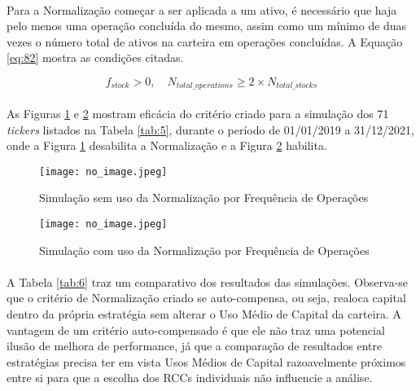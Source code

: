 \paragraph{} Para a Normalização começar a ser aplicada a um ativo, é necessário que haja pelo menos uma operação concluída do mesmo, assim como um mínimo de duas vezes o número total de ativos na carteira em operações concluídas. A Equação \ref{eq:82} mostra as condições citadas.

\begin{equation} \label{eq:82}
    f_{stock} > 0, \quad N_{total\_operations} \ge 2 \times N_{total\_stocks}
\end{equation}

\paragraph{} As Figuras \ref{fig:130} e \ref{fig:131} mostram eficácia do critério criado para a simulação dos 71 \textit{tickers} listados na Tabela \ref{tab:5}, durante o período de 01/01/2019 a 31/12/2021, onde a Figura \ref{fig:130} desabilita a Normalização e a Figura \ref{fig:131} habilita.

\begin{figure}[h]
    \texttt{[image: no\_image.jpeg]}
    \centering
    \caption{Simulação sem uso da Normalização por Frequência de Operações}
    \label{fig:130}
\end{figure}

\begin{figure}[h]
    \texttt{[image: no\_image.jpeg]}
    \centering
    \caption{Simulação com uso da Normalização por Frequência de Operações}
    \label{fig:131}
\end{figure}

\paragraph{} A Tabela \ref{tab:6} traz um comparativo dos resultados das simulações. Observa-se que o critério de Normalização criado se auto-compensa, ou seja, realoca capital dentro da própria estratégia sem alterar o Uso Médio de Capital da carteira. A vantagem de um critério auto-compensado é que ele não traz uma potencial ilusão de melhora de performance, já que a comparação de resultados entre estratégias precisa ter em vista Usos Médios de Capital razoavelmente próximos entre si para que a escolha dos RCCs individuais não influencie a análise.

